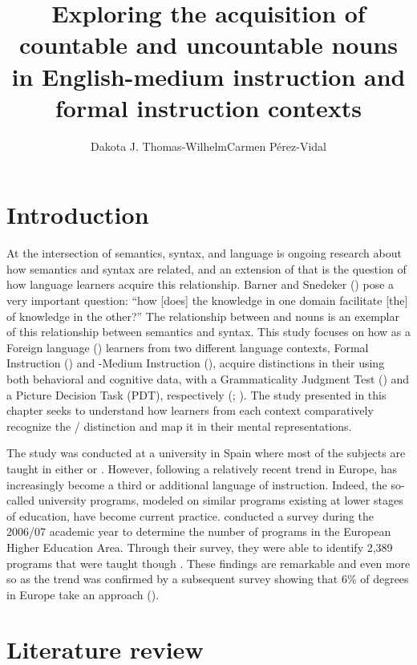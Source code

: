 \documentclass[output=paper]{langsci/langscibook}
\author{Dakota J. Thomas-Wilhelm\affiliation{University of Iowa; Universitat Autònoma de Barcelona}\lastand Carmen Pérez-Vidal\affiliation{Universitat Pompeu Fabra} }
\title{Exploring the acquisition of countable and uncountable nouns in English-medium instruction and formal instruction contexts}
\begin{document}
  


\section{Introduction}

At the intersection of semantics, syntax, and language  is ongoing research about how semantics and syntax are related, and an extension of that is the question of how  language learners acquire this relationship. Barner and Snedeker (\citeyear[42]{BarnerSnedeker2005}) pose a very important question: “how [does] the knowledge in one domain facilitate [the]  of knowledge in the other?” The relationship between  and  nouns is an exemplar of this relationship between semantics and syntax. This study focuses on how  as a Foreign language () learners from two different language  contexts, Formal Instruction () and -Medium Instruction (), acquire  distinctions in their  using both behavioral and cognitive data, with a Grammaticality Judgment Test () and a Picture Decision Task (PDT), respectively (\citealt{Chaudron2003}; \citealt{NorrisOrtega2003}). The study presented in this chapter seeks to understand how  learners from each context comparatively recognize the / distinction and map it in their mental representations. 

The study was conducted at a  university in Spain where most of the subjects are taught in either  or . However, following a relatively recent trend in Europe,  has increasingly become a third or additional language of instruction. Indeed, the so-called university  programs, modeled on similar programs existing at lower stages of education, have become current practice. \citet{WächterMaiworm2014} conducted a survey during the 2006/07 academic year to determine the number of  programs in the European Higher Education Area. Through their survey, they were able to identify 2,389 programs that were taught though . These findings are remarkable and even more so as the trend was confirmed by a subsequent survey showing that 6\% of degrees in Europe take an  approach (\citealt{WächterMaiworm2014}). 


\section{Literature review}
\end{document}
